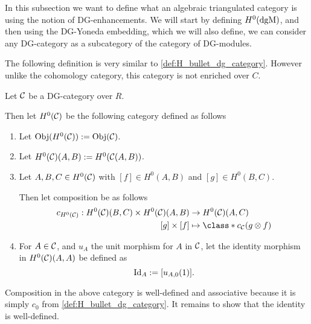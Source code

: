In this subsection we want to define what an algebraic triangulated category is using the notion of DG-enhancements. We will start by defining \( H^0(\operatorname{dgM}) \), and then using the DG-Yoneda embedding, which we will also define, we can consider any DG-category as a subcategory of the category of DG-modules.

The following definition is very similar to \autoref{def:H_bullet_dg_category}. However unlike the cohomology category, this category is not enriched over \( C \).

\begin{definition}
    \label{def:0_th_cohomology_of_dg_cat}
    Let \( {\mathcal{C}} \) be a DG-category over \( R \).

    Then let \( H^0({\mathcal{C}}) \) be the following category defined as follows
    \begin{enumerate}
        \item {
            Let \( \operatorname{Obj}(H^0({\mathcal{C}})) := \operatorname{Obj}({\mathcal{C}}) \).
        }
        \item {
            Let \( H^0({\mathcal{C}})(A, B) := H^0({\mathcal{C}}(A, B)) \).
        }
        \item {
            Let \( A, B, C \in H^0({\mathcal{C}}) \) with \( [f] \in H^0(A, B) \) and \( [g] \in H^0(B, C) \).

            Then let composition be as follows
            \begin{align*}
                c_{H^0(\Cc)}: H^0(\Cc)(B, C) \times H^0(\Cc)(A, B) &\to H^0(\Cc)(A, C) \\
                [g] \times [f] &\mapsto \class*{ c_{\Cc}(g \otimes f) }
            \end{align*}
        }
        \item {
            For \( A \in {\mathcal{C}} \), and \( u_A \) the unit morphism for \( A \) in \( {\mathcal{C}} \), let the identity morphism in \( H^0({\mathcal{C}})(A, A) \) be defined as
            \[
                \operatorname{Id}_A := [u_{A, 0} (1)].
            \]
        }
    \end{enumerate}
\end{definition}

Composition in the above category is well-defined and associative because it is simply \( c_0 \) from \autoref{def:H_bullet_dg_category}. It remains to show that the identity is well-defined.

